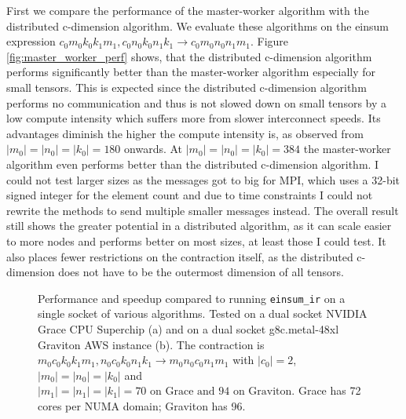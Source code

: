 First we compare the performance of the master-worker algorithm with the distributed c-dimension algorithm.
We evaluate these algorithms on the einsum expression $c_0m_0k_0k_1m_1, c_0n_0k_0n_1k_1 \rightarrow c_0m_0n_0n_1m_1$.
Figure \ref{fig:master_worker_perf} shows, that the distributed c-dimension algorithm performs significantly better than the master-worker algorithm especially for small tensors.
This is expected since the distributed c-dimension algorithm performs no communication and thus is not slowed down on small tensors by a low compute intensity which suffers more from slower interconnect speeds.
Its advantages diminish the higher the compute intensity is, as observed from $|m_0|=|n_0|=|k_0|= 180$ onwards.
At $|m_0|=|n_0|=|k_0|= 384$ the master-worker algorithm even performs better than the distributed c-dimension algorithm.
I could not test larger sizes as the messages got to big for MPI, which uses a 32-bit signed integer for the element count and due to time constraints I could not rewrite the methods to send multiple smaller messages instead.
The overall result still shows the greater potential in a distributed algorithm, as it can scale easier to more nodes and performs better on most sizes, at least those I could test.
It also places fewer restrictions on the contraction itself, as the distributed c-dimension does not have to be the outermost dimension of all tensors.

\begin{figure}[ht]
  \centering
    \begin{subfigure}[t]{1\textwidth}
      
    \end{subfigure}
  \caption{
    Performance and speedup compared to running \texttt{einsum\_ir} on a single socket of various algorithms.
    Tested on a dual socket NVIDIA Grace CPU Superchip (a) and on a dual socket g8c.metal-48xl Graviton AWS instance (b).
    The contraction is $m_0c_0k_0k_1m_1, n_0c_0k_0n_1k_1 \rightarrow m_0n_0c_0n_1m_1$ with $|c_0|=2$, $|m_0|=|n_0|=|k_0|$ and $|m_1|=|n_1|=|k_1|=70\text{ on Grace and } 94\text{ on Graviton}$.
    Grace has 72 cores per NUMA domain; Graviton has 96.
    }
  \label{fig:einsum_ir_perf}
\end{figure}

